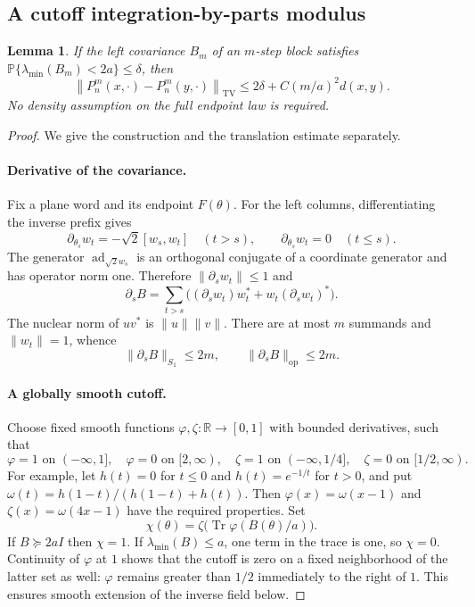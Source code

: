 \documentclass[11pt]{article}
\newtheorem{lemma}[theorem]{Lemma}
\theoremstyle{definition}\newtheorem{definition}[theorem]{Definition}
\theoremstyle{remark}\newtheorem{remark}[theorem]{Remark}
\DeclareMathOperator{\Tr}{Tr}
\DeclareMathOperator{\ad}{ad}
\newcommand{\PP}{\mathbb P}
\newcommand{\op}{\mathrm{op}}
\newcommand{\TV}{\mathrm{TV}}
\newcommand{\norm}[1]{\left\lVert#1\right\rVert}
\begin{document}
\subsection{A cutoff integration-by-parts modulus}
\begin{lemma}\label{lem:tv-modulus}
If the left covariance $B_m$ of an $m$-step block satisfies
$\PP\{\lambda_{\min}(B_m)<2a\}\le\delta$, then
\begin{equation}\label{eq:tv-modulus}
 \norm{P_n^m(x,\cdot)-P_n^m(y,\cdot)}_{\TV}
 \le2\delta+C(m/a)^2d(x,y).
\end{equation}
No density assumption on the full endpoint law is required.
\end{lemma}
\begin{proof}
We give the construction and the translation estimate separately.

\paragraph{Derivative of the covariance.}
Fix a plane word and its endpoint $F(\theta)$. For the left columns, differentiating the inverse prefix gives
\begin{equation}\label{eq:TV-columns-expanded}
 \partial_{\theta_s}w_t=-\sqrt2[w_s,w_t]\quad(t>s),
 \qquad \partial_{\theta_s}w_t=0\quad(t\le s).
\end{equation}
The generator $\ad_{\sqrt2w_s}$ is an orthogonal conjugate of a coordinate generator and has operator norm one. Therefore $\|\partial_sw_t\|\le1$ and
\[
 \partial_s B=\sum_{t>s}\bigl((\partial_sw_t)w_t^*+
                                    w_t(\partial_sw_t)^*\bigr).
\]
The nuclear norm of $uv^*$ is $\|u\|\|v\|$. There are at most $m$ summands and $\|w_t\|=1$, whence
\begin{equation}\label{eq:TV-nuclear-expanded}
 \|\partial_sB\|_{S_1}\le2m,
 \qquad \|\partial_sB\|_{\op}\le2m.
\end{equation}

\paragraph{A globally smooth cutoff.}
Choose fixed smooth functions $\varphi,\zeta:\mathbb R\to[0,1]$ with bounded derivatives, such that
\[
 \varphi=1\text{ on }(-\infty,1],\quad\varphi=0\text{ on }[2,\infty),
 \quad
 \zeta=1\text{ on }(-\infty,1/4],\quad\zeta=0\text{ on }[1/2,\infty).
\]
For example, let $h(t)=0$ for $t\le0$ and $h(t)=e^{-1/t}$ for $t>0$, and put
$\omega(t)=h(1-t)/(h(1-t)+h(t))$. Then $\varphi(x)=\omega(x-1)$ and
$\zeta(x)=\omega(4x-1)$ have the required properties.
Set
\begin{equation}\label{eq:TV-cutoff-expanded}
 \chi(\theta)=\zeta\bigl(\Tr\varphi(B(\theta)/a)\bigr).
\end{equation}
If $B\succeq2aI$ then $\chi=1$. If $\lambda_{\min}(B)\le a$, one term in the trace is one, so $\chi=0$. Continuity of $\varphi$ at $1$ shows that the cutoff is zero on a fixed neighborhood of the latter set as well: $\varphi$ remains greater than $1/2$ immediately to the right of $1$. This ensures smooth extension of the inverse field below.


\end{proof}
\end{document}
